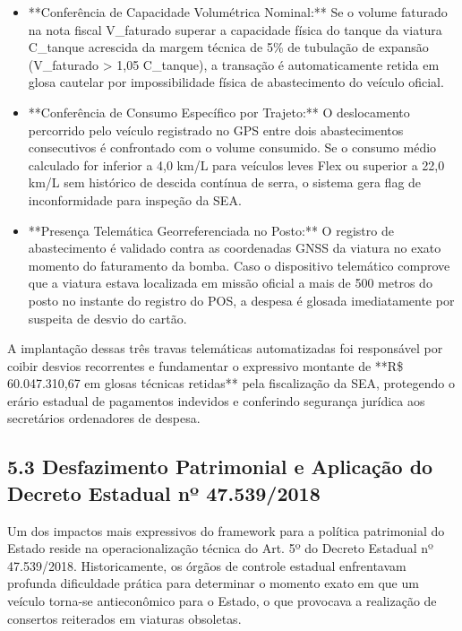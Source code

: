 \documentclass[10pt,a4paper,journal]{article}
\begin{document}
\begin{itemize}
\item **Conferência de Capacidade Volumétrica Nominal:** Se o volume faturado na nota fiscal V\_{faturado} superar a capacidade física do tanque da viatura C\_{tanque} acrescida da margem técnica de 5\% de tubulação de expansão (V\_{faturado} > 1,05 C\_{tanque}), a transação é automaticamente retida em glosa cautelar por impossibilidade física de abastecimento do veículo oficial.
\end{itemize}
\begin{itemize}
\item **Conferência de Consumo Específico por Trajeto:** O deslocamento percorrido pelo veículo registrado no GPS entre dois abastecimentos consecutivos é confrontado com o volume consumido. Se o consumo médio calculado for inferior a 4,0 km/L para veículos leves Flex ou superior a 22,0 km/L sem histórico de descida contínua de serra, o sistema gera flag de inconformidade para inspeção da SEA.
\end{itemize}
\begin{itemize}
\item **Presença Telemática Georreferenciada no Posto:** O registro de abastecimento é validado contra as coordenadas GNSS da viatura no exato momento do faturamento da bomba. Caso o dispositivo telemático comprove que a viatura estava localizada em missão oficial a mais de 500 metros do posto no instante do registro do POS, a despesa é glosada imediatamente por suspeita de desvio do cartão.
\end{itemize}
A implantação dessas três travas telemáticas automatizadas foi responsável por coibir desvios recorrentes e fundamentar o expressivo montante de **R\$ 60.047.310,67 em glosas técnicas retidas** pela fiscalização da SEA, protegendo o erário estadual de pagamentos indevidos e conferindo segurança jurídica aos secretários ordenadores de despesa.

\subsection{5.3 Desfazimento Patrimonial e Aplicação do Decreto Estadual nº 47.539/2018}
Um dos impactos mais expressivos do framework para a política patrimonial do Estado reside na operacionalização técnica do Art. 5º do Decreto Estadual nº 47.539/2018. Historicamente, os órgãos de controle estadual enfrentavam profunda dificuldade prática para determinar o momento exato em que um veículo torna-se antieconômico para o Estado, o que provocava a realização de consertos reiterados em viaturas obsoletas.
\end{document}
